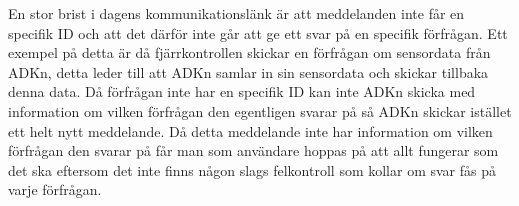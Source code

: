 En stor brist i dagens kommunikationslänk är att meddelanden inte får en specifik ID och 
att det därför inte går att ge ett svar på en specifik förfrågan. Ett exempel på detta är då fjärrkontrollen skickar en 
förfrågan om sensordata från ADKn, detta leder till att ADKn samlar in sin sensordata och skickar tillbaka denna data. 
Då förfrågan inte har en specifik ID kan inte ADKn skicka med information om vilken förfrågan den egentligen svarar på 
så ADKn skickar istället ett helt nytt meddelande. Då detta meddelande inte har information om vilken förfrågan den svarar 
på får man som användare hoppas på att allt fungerar som det ska eftersom det inte finns någon slags felkontroll som kollar 
om svar fås på varje förfrågan.
